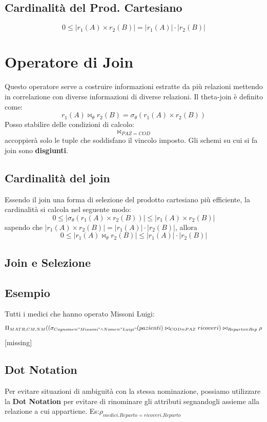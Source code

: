 \documentclass[10pt,twocolumn]{article}
\begin{document}
\subsection{Cardinalità del Prod. Cartesiano}
\[0 \leq |r_1(A) \times r_2(B)| = |r_1(A)|\cdot |r_2(B)|\]
\section{Operatore di Join}
Questo operatore serve a costruire informazioni estratte da più relazioni mettendo in correlazione con diverse informazioni di diverse relazioni.
Il theta-join è definito come:\[r_1(A)\bowtie_\theta r_2(B) = \sigma_\theta (r_1(A)\times r_2(B))\]
Posso stabilire delle condizioni di calcolo: \[\bowtie_{PAZ=COD}\] accoppierà solo le tuple che soddisfano il vincolo imposto. Gli schemi su cui si fa join sono \textbf{disgiunti}. 
\subsection{Cardinalità del join}
Essendo il join una forma di selezione del prodotto cartesiano più efficiente, la cardinalità si calcola nel seguente modo:\[ 0\leq |\sigma_\theta(r_1(A)\times r_2(B))| \leq |r_1(A) \times r_2(B)| \]
sapendo che $|r_1(A)\times r_2(B)| = |r_1(A)|\cdot|r_2(B)|$, allora \[0 \leq |r_1(A) \bowtie_\theta r_2(B)| \leq |r_1(A)|\cdot|r_2(B)|\]
\subsection{Join e Selezione}

\subsection{Esempio}
Tutti i medici che hanno operato Missoni Luigi:
\[\Pi_{MATR,CM,NM}((\sigma_{Cognome="Missoni"\land Nome = "Luigi" }(pazienti)\bowtie_{COD=PAZ}ricoveri)\bowtie_{Reparto=Rep} \rho \] [missing]

\subsection{Dot Notation}
Per evitare situazioni di ambiguità con la stessa nominazione, possiamo utilizzare la \textbf{Dot Notation} per evitare di rinominare gli attributi segnandogli assieme alla relazione a cui appartiene.
Es:$\rho_{medici.Reparto=ricoveri.Reparto}$
\end{document}
